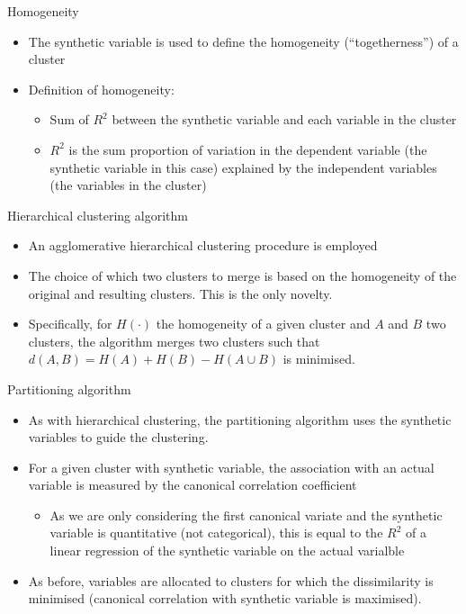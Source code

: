 \documentclass[
  ignorenonframetext,
  aspectratio=169,
]{beamer}
\providecommand{\tightlist}{%
  \setlength{\itemsep}{0pt}\setlength{\parskip}{0pt}}\usepackage{longtable,booktabs,array}
\begin{document}
\begin{frame}{Homogeneity}
\protect\hypertarget{homogeneity}{}
\begin{itemize}
\tightlist
\item
  The synthetic variable is used to define the homogeneity
  (``togetherness'') of a cluster
\item
  Definition of homogeneity:

  \begin{itemize}
  \tightlist
  \item
    Sum of \(R^2\) between the synthetic variable and each variable in
    the cluster
  \item
    \(R^2\) is the sum proportion of variation in the dependent variable
    (the synthetic variable in this case) explained by the independent
    variables (the variables in the cluster)
  \end{itemize}
\end{itemize}
\end{frame}

\begin{frame}{Hierarchical clustering algorithm}
\protect\hypertarget{hierarchical-clustering-algorithm}{}
\begin{itemize}
\tightlist
\item
  An agglomerative hierarchical clustering procedure is employed
\item
  The choice of which two clusters to merge is based on the homogeneity
  of the original and resulting clusters. This is the only novelty.
\item
  Specifically, for \(H(\cdot)\) the homogeneity of a given cluster and
  \(A\) and \(B\) two clusters, the algorithm merges two clusters such
  that \(d(A, B) = H(A) + H(B) - H(A\cup B)\) is minimised.
\end{itemize}
\end{frame}

\begin{frame}{Partitioning algorithm}
\protect\hypertarget{partitioning-algorithm}{}
\begin{itemize}
\tightlist
\item
  As with hierarchical clustering, the partitioning algorithm uses the
  synthetic variables to guide the clustering.
\item
  For a given cluster with synthetic variable, the association with an
  actual variable is measured by the canonical correlation coefficient

  \begin{itemize}
  \tightlist
  \item
    As we are only considering the first canonical variate and the
    synthetic variable is quantitative (not categorical), this is equal
    to the \(R^2\) of a linear regression of the synthetic variable on
    the actual varialble
  \end{itemize}
\item
  As before, variables are allocated to clusters for which the
  dissimilarity is minimised (canonical correlation with synthetic
  variable is maximised).
\end{itemize}
\end{frame}
\end{document}
